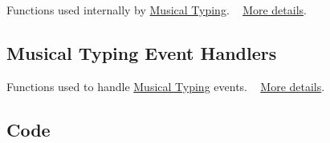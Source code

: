 Functions used internally by \hyperlink{group___mus_typ}{Musical Typing}. ~\newline
 \hyperlink{group___mus_typ_priv_func}{More details}.\hypertarget{group___mus_typ_mushandle}{}\subsection{Musical Typing Event Handlers}\label{group___mus_typ_mushandle}
Functions used to handle \hyperlink{group___mus_typ}{Musical Typing} events. ~\newline
 \hyperlink{group___mus_typ_handlers}{More details}.\hypertarget{group___mus_typ_muscode}{}\subsection{Code}\label{group___mus_typ_muscode}

